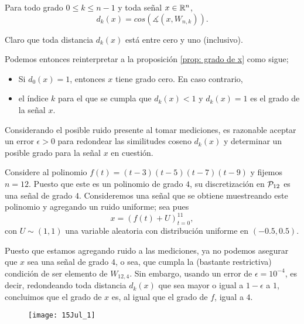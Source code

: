 \begin{notacion}
Para todo grado $0 \leq k \leq n-1$ y toda señal $x \in \mathbb{R}^{n}$,
\begin{equation}
	\label{eq: distancia de x a Wnk}
	d_{k}(x) = cos(\measuredangle(x, W_{n,k})).
\end{equation}
\end{notacion}
Claro que toda distancia $d_{k}(x)$ está entre cero y uno
(inclusivo).

Podemos entonces reinterpretar a la proposición
\ref{prop: grado de x} como sigue;
\begin{itemize}
	\item Si $d_{0}(x) = 1$, entonces $x$ tiene grado cero. En caso 
	contrario,
	\item el índice $k$ para el que se cumpla que $d_{k}(x) < 1$
	y $d_{k}(x) = 1$ es el grado de la señal $x$.
\end{itemize} 

Considerando el posible ruido presente al tomar
mediciones, es razonable aceptar un error $\epsilon > 0$
para redondear las similitudes coseno $d_{k}(x)$ y
determinar un posible grado para la señal $x$ en cuestión.


\begin{ejemplo}
Considere al polinomio $f(t) = (t-3)(t-5)(t-7)(t-9)$
y fijemos $n = 12$. Puesto que este es un polinomio de grado 
$4$, su discretización en $\mathcal{P}_{12}$ es una señal de
grado $4$. Consideremos una señal que se obtiene muestreando
este polinomio y agregando un ruido uniforme; sea pues
\begin{equation}
	\label{eq: x con ruido}
	x = (f(t) + U )_{t=0}^{11},
\end{equation}
con $U \sim (1, 1)$ una variable aleatoria con distribución
uniforme en $(-0.5, 0.5)$.

Puesto que estamos agregando ruido a las mediciones,
ya no podemos asegurar que $x$ sea una 
señal de grado $4$, o sea, que cumpla la (bastante restrictiva)
condición de ser elemento de $W_{12,4}$. Sin embargo,
usando un error de $\epsilon = 10^{-4}$, es decir, 
redondeando toda distancia $d_{k}(x)$ que sea mayor o igual
a $1 - \epsilon$ a $1$, concluimos que el grado de $x$ es,
al igual que el grado de $f$, igual a $4$. 

\begin{figure}[H]
	\centering
	\texttt{[image: 15Jul\_1]} 
\end{figure}	
\final
\end{ejemplo}

